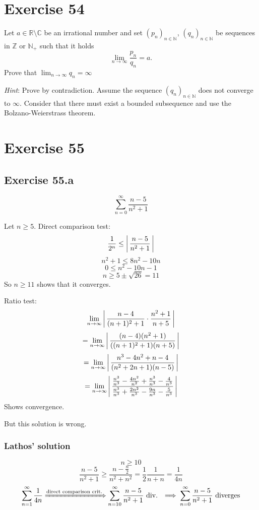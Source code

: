 \documentclass[a4paper]{article}
\theoremstyle{definition}
\newcommand\abs[1]{\left|\thinspace #1\thinspace\right|}
\newcommand\seq[1]{\left(#1\right)_{n\in\mathbb N}}
\begin{document}
\section{Exercise 54}
\begin{ex}
  Let $a \in \mathbb R \setminus \mathbb C$ be an irrational number and set $\seq{p_n}$, $\seq{q_n}$ be sequences in $\mathbb Z$ or $\mathbb N_+$ such that it holds
  \[ \lim_{n\to\infty} \frac{p_n}{q_n} = a. \]
  Prove that $\lim_{n\to\infty} q_n = \infty$

  \emph{Hint}: Prove by contradiction. Assume the sequence $\seq{q_n}$ does not converge to $\infty$.
  Consider that there must exist a bounded subsequence and use the Bolzano-Weierstrass theorem.
\end{ex}

\section{Exercise 55}
%
\subsection{Exercise 55.a}
\[ \sum_{n=0}^\infty \frac{n-5}{n^2 + 1} \]

Let $n \geq 5$. Direct comparison test:
\[ \frac{1}{2^n} \leq \abs{\frac{n-5}{n^2+1}} \]
\[ n^2 + 1 \leq 8n^2 - 10n \]
\[ 0 \leq n^2 - 10n - 1 \]
\[ n \geq 5 \pm \sqrt{26} = 11 \]
So $n \geq 11$ shows that it converges.

Ratio test:
\[ \lim_{n\to\infty} \abs{\frac{n-4}{(n+1)^2 + 1} \cdot \frac{n^2+1}{n+5}} \]
\[ = \lim_{n\to\infty} \abs{\frac{(n-4)(n^2+1)}{((n+1)^2 + 1)(n+5)}} \]
\[ = \lim_{n\to\infty} \abs{\frac{n^3 - 4n^2 + n - 4}{(n^2+2n+1)(n-5)}} \]
\[ = \lim_{n\to\infty} \abs{\frac{\frac{n^3}{n^3} - \frac{4n^2}{n^2} + \frac{n^3}{n^3} - \frac{4}{n^3}}{\frac{n^3}{n^3} + \frac{2n^2}{n^3} - \frac{9n}{n^3} - \frac{5}{n^3}}} \]
Shows convergence.

But this solution is wrong.

\subsubsection{Lathos' solution}
\[ n \geq 10 \]
\[ \frac{n-5}{n^2+1} \geq \frac{n-\frac{n}{2}}{n^2+n^2} = \frac12 \frac{1}{n+n} = \frac1{4n} \]
\[
  \sum_{n=1}^\infty \frac{1}{4n}
  \xRightarrow{\text{direct comparison crit.}} \sum_{n=10}^\infty \frac{n-5}{n^2+1} \text{ div. }
  \implies \sum_{n=0}^\infty \frac{n-5}{n^2+1} \text{ diverges}
\]
\end{document}
